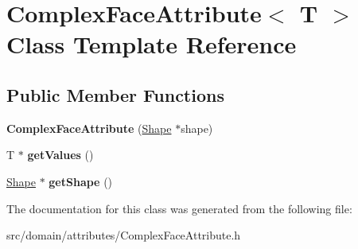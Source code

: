 \hypertarget{class_complex_face_attribute}{}\section{Complex\+Face\+Attribute$<$ T $>$ Class Template Reference}
\label{class_complex_face_attribute}
\subsection*{Public Member Functions}
\begin{DoxyCompactItemize}
\item 
\hypertarget{class_complex_face_attribute_a0a368d357dc8c24147ba744d7aabce89}{}{\bfseries Complex\+Face\+Attribute} (\hyperlink{class_shape}{Shape} $\ast$shape)\label{class_complex_face_attribute_a0a368d357dc8c24147ba744d7aabce89}

\item 
\hypertarget{class_complex_face_attribute_a11a16213cd62e7ada0b8a36d75043406}{}T $\ast$ {\bfseries get\+Values} ()\label{class_complex_face_attribute_a11a16213cd62e7ada0b8a36d75043406}

\item 
\hypertarget{class_complex_face_attribute_a05013475941221a1ef50b374c2c3d2d4}{}\hyperlink{class_shape}{Shape} $\ast$ {\bfseries get\+Shape} ()\label{class_complex_face_attribute_a05013475941221a1ef50b374c2c3d2d4}

\end{DoxyCompactItemize}


The documentation for this class was generated from the following file\+:\begin{DoxyCompactItemize}
\item 
src/domain/attributes/Complex\+Face\+Attribute.\+h\end{DoxyCompactItemize}
